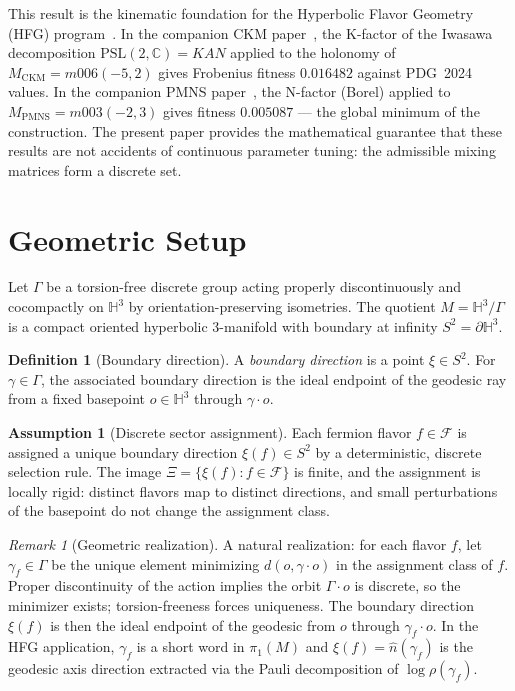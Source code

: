 \documentclass[11pt,a4paper]{article}
\theoremstyle{definition}
\newtheorem{definition}[theorem]{Definition}
\newtheorem{assumption}[theorem]{Assumption}
\theoremstyle{remark}
\newtheorem{remark}[theorem]{Remark}
\begin{document}
This result is the kinematic foundation for the Hyperbolic Flavor
Geometry (HFG) program~\cite{Gentry:Unified}.
In the companion CKM paper~\cite{Gentry:CKM}, the K-factor of the
Iwasawa decomposition $\mathrm{PSL}(2,\mathbb{C})=KAN$ applied to
the holonomy of $M_{\mathrm{CKM}}=m006(-5,2)$ gives Frobenius
fitness $0.016482$ against PDG~2024 values.
In the companion PMNS paper~\cite{Gentry:PMNS}, the N-factor (Borel)
applied to $M_{\mathrm{PMNS}}=m003(-2,3)$ gives fitness $0.005087$
--- the global minimum of the construction.
The present paper provides the mathematical guarantee that these
results are not accidents of continuous parameter tuning: the
admissible mixing matrices form a discrete set.

\section{Geometric Setup}

Let $\Gamma$ be a torsion-free discrete group acting properly
discontinuously and cocompactly on $\mathbb{H}^3$ by
orientation-preserving isometries. The quotient $M=\mathbb{H}^3/\Gamma$
is a compact oriented hyperbolic 3-manifold with boundary at
infinity $S^2=\partial\mathbb{H}^3$.

\begin{definition}[Boundary direction]
A \emph{boundary direction} is a point $\xi\in S^2$.
For $\gamma\in\Gamma$, the associated boundary direction is the
ideal endpoint of the geodesic ray from a fixed basepoint $o\in\mathbb{H}^3$
through $\gamma\cdot o$.
\end{definition}

\begin{assumption}[Discrete sector assignment]
\label{ass:discrete}
Each fermion flavor $f\in\mathcal{F}$ is assigned a unique boundary
direction $\xi(f)\in S^2$ by a deterministic, discrete selection rule.
The image $\Xi=\{\xi(f):f\in\mathcal{F}\}$ is finite, and the
assignment is locally rigid: distinct flavors map to distinct
directions, and small perturbations of the basepoint do not change
the assignment class.
\end{assumption}

\begin{remark}[Geometric realization]
A natural realization: for each flavor $f$, let $\gamma_f\in\Gamma$
be the unique element minimizing $d(o,\gamma\cdot o)$ in the
assignment class of $f$. Proper discontinuity of the action implies
the orbit $\Gamma\cdot o$ is discrete, so the minimizer exists;
torsion-freeness forces uniqueness. The boundary direction $\xi(f)$
is then the ideal endpoint of the geodesic from $o$ through
$\gamma_f\cdot o$. In the HFG application, $\gamma_f$ is a short
word in $\pi_1(M)$ and $\xi(f)=\hat{n}(\gamma_f)$ is the
geodesic axis direction extracted via the Pauli decomposition of
$\log\rho(\gamma_f)$.
\end{remark}
\end{document}

